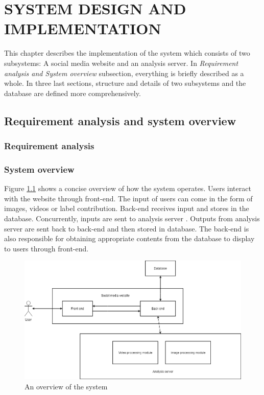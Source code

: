 \chapter{SYSTEM DESIGN AND IMPLEMENTATION}
\label{chap:caseFarming}

This chapter describes the implementation of the system which consists of two subsystems: A social media website and an analysis server. In \textit{Requirement analysis and System overview} subsection, everything is briefly described as a whole. In three last sections, structure and details of two subsystems and the database are defined more comprehensively.

\section{Requirement analysis and system overview}
\subsection{Requirement analysis}

\subsection{System overview}
Figure \ref{chap3:system_overview_basic} shows a concise overview of how the system operates. Users interact with the website through front-end. The input of users can come in the form of images, videos or label contribution. Back-end receives input and stores in the database. Concurrently, inputs are sent to analysis server . Outputs from analysis server are sent back to back-end and then stored in database. The back-end is also responsible for obtaining appropriate contents from the database to display to users through front-end.

\begin{center}
    \begin{figure}[H]
    \centering
    \includegraphics[width=1\columnwidth]{images/chap3/system_overview_basic.png}
    \caption{An overview of the system}
    \label{chap3:system_overview_basic}
    \end{figure}
\end{center}

